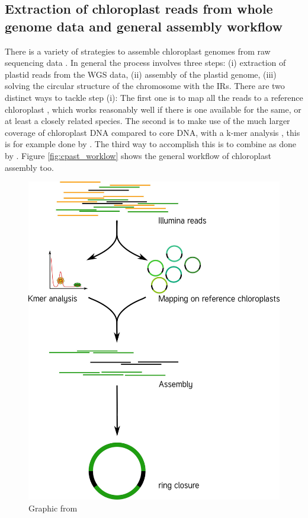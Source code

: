 \subsection{Extraction of chloroplast reads from whole genome data and general assembly workflow}
There is a variety of strategies to assemble chloroplast genomes from raw sequencing data \cite{twyford_strategies_2017}. In general the process involves three steps: (i) extraction of plastid reads from the WGS data, (ii) assembly of the plastid genome, (iii) solving the circular structure of the chromosome with the IRs. There are two distinct ways to tackle step (i): The first one is to map all the reads to a reference chloroplast \cite{Vinga2012}, which works reasonably well if there is one available for the same, or at least a closely related species. The second is to make use of the much larger coverage of chloroplast DNA compared to core DNA, with a k-mer analysis \cite{Chan2013}, this is for example done by \ce \cite{j_ankenbrand_chloroextractor:_2018}. The third way to accomplish this is to combine as done by \np  \cite{dierckxsens_novoplasty:_2017}.
Figure \ref{fig:cpast_worklow} shows the general workflow of chloroplast assembly too. 


\begin{figure}[H]
\centering
\includegraphics[height=.65\textheight, width=.95\textwidth]{Figures/CE_workflow}
\decoRule
\caption[Chloroplast genom assembly workflow]{Graphic from \cite{j_ankenbrand_chloroextractor:_2018} }
\label{fig:cpast_workflow}
\end{figure}


